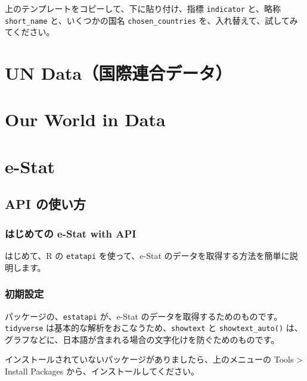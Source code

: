 \documentclass[
  xelatex, ja=standard]{bxjsbook}
\theoremstyle{definition}
\theoremstyle{definition}
\theoremstyle{definition}
\theoremstyle{definition}
\theoremstyle{remark}
\begin{document}
上のテンプレートをコピーして、下に貼り付け、指標 \texttt{indicator} と、略称 \texttt{short\_name} と、いくつかの国名 \texttt{chosen\_countries} を、入れ替えて、試してみてください。

\hypertarget{un}{%
\chapter{UN Data（国際連合データ）}\label{un}}

\hypertarget{owid}{%
\chapter{Our World in Data}\label{owid}}

\hypertarget{estat}{%
\chapter{e-Stat}\label{estat}}

\hypertarget{api-ux306eux4f7fux3044ux65b9}{%
\section{API の使い方}\label{api-ux306eux4f7fux3044ux65b9}}

\hypertarget{ux306fux3058ux3081ux3066ux306e-e-stat-with-api}{%
\subsection{はじめての e-Stat with API}\label{ux306fux3058ux3081ux3066ux306e-e-stat-with-api}}

はじめて、R の \texttt{etatapi} を使って、e-Stat のデータを取得する方法を簡単に説明します。

\hypertarget{ux521dux671fux8a2dux5b9a}{%
\subsection*{初期設定}\label{ux521dux671fux8a2dux5b9a}}

パッケージの、\texttt{estatapi} が、e-Stat のデータを取得するためのものです。\texttt{tidyverse} は基本的な解析をおこなうため、\texttt{showtext} と \texttt{showtext\_auto()} は、グラフなどに、日本語が含まれる場合の文字化けを防ぐためのものです。

インストールされていないパッケージがありましたら、上のメニューの Tools \textgreater{} Install Packages から、インストールしてください。
\end{document}
